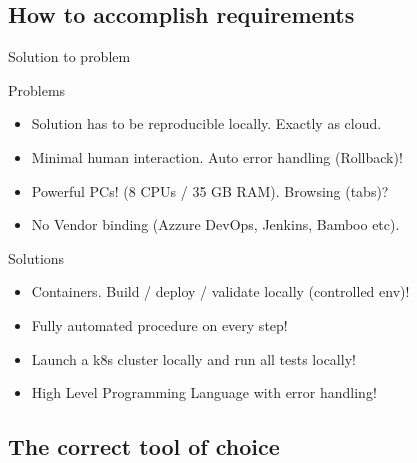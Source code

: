 \subsection{How to accomplish requirements}

\begin{frame}{Solution to problem}
	\begin{alertblock}{Problems}
		\begin{itemize}
			\item<1-| alert@1> Solution has to be reproducible locally. \alert{Exactly as cloud}.
			\item<2-| alert@2> Minimal human interaction. Auto \alert{error handling} (Rollback)!
			\item<3-| alert@3> \alert{Powerful PCs!} (8 CPUs / 35 GB RAM). Browsing (tabs)?
			\item<4-| alert@4> \alert{No Vendor binding} (Azzure DevOps, Jenkins, Bamboo etc).
		\end{itemize}	
	\end{alertblock}
	\begin{exampleblock}{Solutions}
		\begin{itemize}
			\item<1-| alert@1> \alert{Containers}. Build / deploy / validate locally (controlled env)!
			\item<2-| alert@2> Fully \alert{automated procedure} on every step!
			\item<3-| alert@3> Launch a \alert{k8s cluster locally} and run all tests locally!
			\item<4-| alert@4> High Level Programming Language with \alert{error handling}!
		\end{itemize}	
	\end{exampleblock}
\end{frame}

\subsection{The correct tool of choice}

